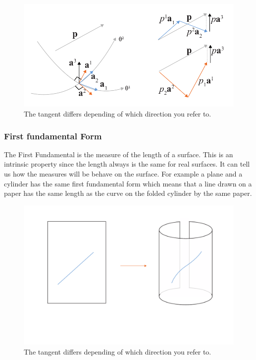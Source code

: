 \begin{figure}[H]
\centering
\includegraphics[width=0.8\linewidth ]{figure/Theory/Covariant.pdf}
\caption{The tangent differs depending of which direction you refer to. }
\end{figure}




\subsubsection{First fundamental Form}

The First Fundamental is the measure of the length of a surface. This is an intrinsic property since the length always is the same for real surfaces. It can tell us how the measures will be behave on the surface. For example a plane and a cylinder has the same first fundamental form which means that  a line drawn on a paper has the same length as the curve on the folded cylinder by the same paper.

\begin{figure}[H]
\centering
\includegraphics[width=0.9\linewidth ]{figure/Theory/FirstFundamental.pdf}
\caption{The tangent differs depending of which direction you refer to. }
\end{figure}

